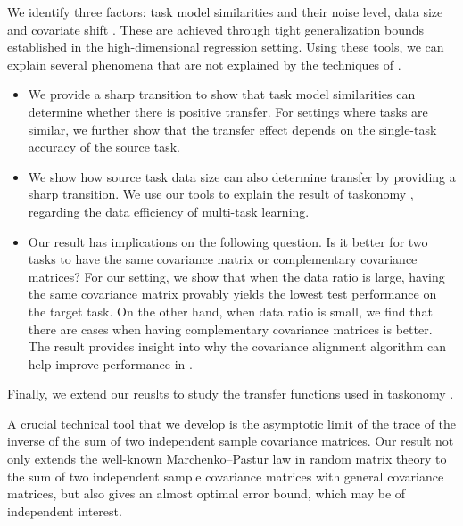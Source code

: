 
	We identify three factors: task model similarities and their noise level, data size and covariate shift \cite{PY09,K18}.
	These are achieved through tight generalization bounds established in the high-dimensional regression setting.
	Using these tools, we can explain several phenomena that are not explained by the techniques of \cite{WZR20}.
	\begin{itemize}
		\item We provide a sharp transition to show that task model similarities can determine whether there is positive transfer.
		For settings where tasks are similar, we further show that the transfer effect depends on the single-task accuracy of the source task.
		\item We show how source task data size can also determine transfer by providing a sharp transition.
		We use our tools to explain the result of taskonomy \cite{ZSSGM18}, regarding the data efficiency of multi-task learning.
		\item Our result has implications on the following question.
	Is it better for two tasks to have the same covariance matrix or complementary covariance matrices?
	For our setting, we show that when the data ratio is large, having the same covariance matrix provably yields the lowest test performance on the target task.
	On the other hand, when data ratio is small, we find that there are cases when having complementary covariance matrices is better.
	The result provides insight into why the covariance alignment algorithm can help improve performance in \cite{WZR20}.
	\end{itemize}


Finally, we extend our reuslts to study the transfer functions used in taskonomy \cite{ZSSGM18}.

A crucial technical tool that we develop is the asymptotic limit of the trace of the inverse of the sum of two independent sample covariance matrices. Our result not only extends the well-known Marchenko–Pastur law in random matrix theory to the sum of two independent sample covariance matrices with general covariance matrices, but also gives an almost optimal error bound, which may be of independent interest.


